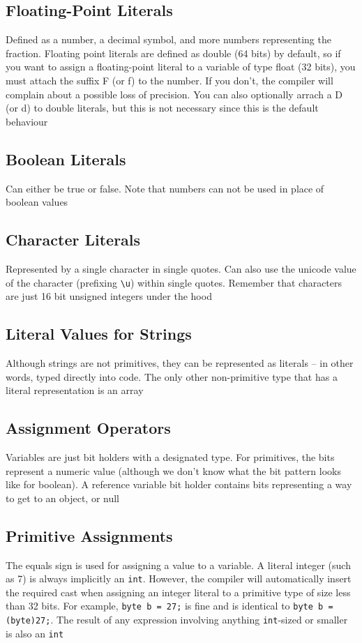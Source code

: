 \subsection{Floating-Point Literals}
Defined as a number, a decimal symbol, and more numbers representing the 
fraction. Floating point literals are defined as double (64 bits) by default, 
so if you want to assign a floating-point literal to a variable of type float 
(32 bits), you must attach the suffix F (or f) to the number. If you don't, the 
compiler will complain about a possible loss of precision. You can also 
optionally arrach a D (or d) to double literals, but this is not necessary 
since this is the default behaviour

\subsection{Boolean Literals}
Can either be true or false. Note that numbers can not be used in place of 
boolean values

\subsection{Character Literals}
Represented by a single character in single quotes. Can also use the unicode 
value of the character (prefixing \verb#\u#) within single quotes. Remember 
that characters are just 16 bit unsigned integers under the hood

\subsection{Literal Values for Strings}
Although strings are not primitives, they can be represented as literals -- in 
other words, typed directly into code. The only other non-primitive type that 
has a literal representation is an array

\subsection{Assignment Operators}
Variables are just bit holders with a designated type. For primitives, the bits 
represent a numeric value (although we don't know what the bit pattern looks 
like for boolean). A reference variable bit holder contains bits representing a 
way to get to an object, or null

\subsection{Primitive Assignments}
The equals sign is used for assigning a value to a variable. A literal integer 
(such as 7) is always implicitly an \verb#int#. However, the compiler will 
automatically insert the required cast when assigning an integer literal to a 
primitive type of size less than 32 bits. For example, \verb#byte b = 27;# is 
fine and is identical to \verb#byte b = (byte)27;#. The result of any 
expression involving anything \verb#int#-sized or smaller is also an \verb#int#

